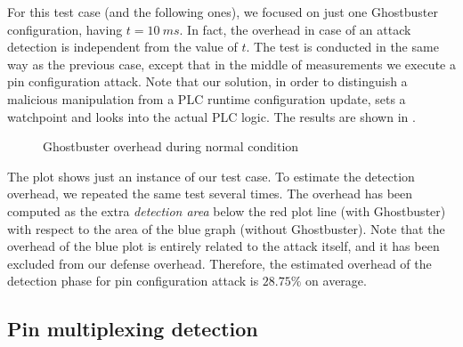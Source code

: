 For this test case (and the following ones), we focused on just one Ghostbuster configuration, having $t = \SI{10}{ms}$.
In fact, the overhead in case of an attack detection is independent from the value of $t$.
The test is conducted in the same way as the previous case, except that in the middle of measurements we execute a pin configuration attack.
Note that our solution, in order to distinguish a malicious manipulation from a PLC runtime configuration update, sets a watchpoint and looks into the actual PLC logic.
The results are shown in .
\begin{figure}[h]
\centering
{}
\caption{Ghostbuster overhead during normal condition}
\label{fig:pinconf-overhead}
\end{figure}
The plot shows just an instance of our test case. To estimate the detection overhead, we repeated the same test several times.
The overhead has been computed as the extra \emph{detection area} below the red plot line (with Ghostbuster) with respect to the area of the blue graph (without Ghostbuster).
Note that the overhead of the blue plot is entirely related to the attack itself, and it has been excluded from our defense overhead.
Therefore, the estimated overhead of the detection phase for pin configuration attack is $28.75\%$ on average.


\subsection{Pin multiplexing detection}

